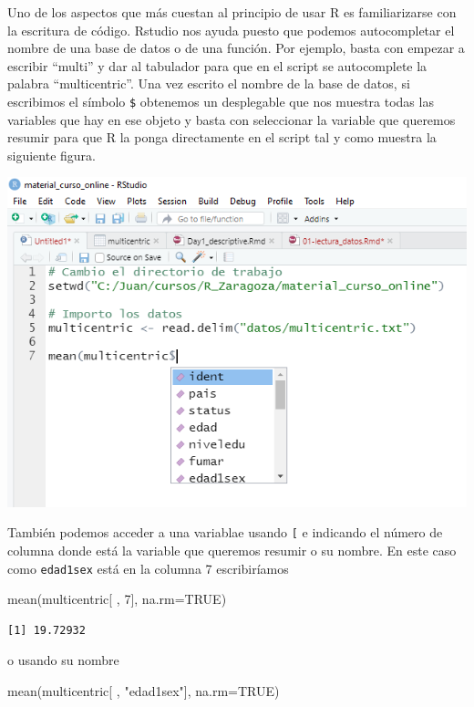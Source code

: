 \documentclass[
]{book}
\newenvironment{Shaded}{\begin{snugshade}}{\end{snugshade}}
\newcommand{\AttributeTok}[1]{\textcolor[rgb]{0.77,0.63,0.00}{#1}}
\newcommand{\ConstantTok}[1]{\textcolor[rgb]{0.00,0.00,0.00}{#1}}
\newcommand{\DecValTok}[1]{\textcolor[rgb]{0.00,0.00,0.81}{#1}}
\newcommand{\FunctionTok}[1]{\textcolor[rgb]{0.00,0.00,0.00}{#1}}
\newcommand{\NormalTok}[1]{#1}
\newcommand{\StringTok}[1]{\textcolor[rgb]{0.31,0.60,0.02}{#1}}
\begin{document}
Uno de los aspectos que más cuestan al principio de usar R es familiarizarse con la escritura de código. Rstudio nos ayuda puesto que podemos autocompletar el nombre de una base de datos o de una función. Por ejemplo, basta con empezar a escribir ``multi'' y dar al tabulador para que en el script se autocomplete la palabra ``multicentric''. Una vez escrito el nombre de la base de datos, si escribimos el símbolo \texttt{\$} obtenemos un desplegable que nos muestra todas las variables que hay en ese objeto y basta con seleccionar la variable que queremos resumir para que R la ponga directamente en el script tal y como muestra la siguiente figura.

\includegraphics{figures/autocompleta.png}

También podemos acceder a una variablae usando \texttt{{[}} e indicando el número de columna donde está la variable que queremos resumir o su nombre. En este caso como \texttt{edad1sex} está en la columna 7 escribiríamos

\begin{Shaded}
\begin{Highlighting}[]
\FunctionTok{mean}\NormalTok{(multicentric[ , }\DecValTok{7}\NormalTok{], }\AttributeTok{na.rm=}\ConstantTok{TRUE}\NormalTok{)}
\end{Highlighting}
\end{Shaded}

\begin{verbatim}
[1] 19.72932
\end{verbatim}

o usando su nombre

\begin{Shaded}
\begin{Highlighting}[]
\FunctionTok{mean}\NormalTok{(multicentric[ , }\StringTok{"edad1sex"}\NormalTok{], }\AttributeTok{na.rm=}\ConstantTok{TRUE}\NormalTok{)}
\end{Highlighting}
\end{Shaded}
\end{document}
